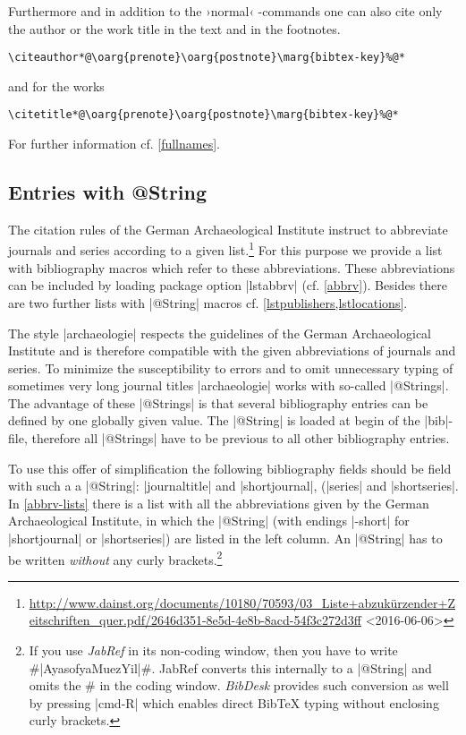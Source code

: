 \documentclass[a4paper,
10pt,
greek,
french,
spanish,
italian,
ngerman,
english
]{ltxdoc}
\begin{document}
\DescribeMacro{\citeauthor}\DescribeMacro{\citetitle}\label{citeauthor}%
Furthermore and in addition to the ›normal‹ -commands one can also cite only the author or the work title in the text and in the footnotes.
\begin{lstlisting}
\citeauthor*@\oarg{prenote}\oarg{postnote}\marg{bibtex-key}%@*
\end{lstlisting} 
  and for the works 
\begin{lstlisting}
\citetitle*@\oarg{prenote}\oarg{postnote}\marg{bibtex-key}%@*
\end{lstlisting} 
For further information cf. \cref{fullnames}.


\subsection{Entries with @String}\label{string}
The citation rules of the German Archaeological Institute instruct to abbreviate journals and series according to a given list.\footnote{\url{http://www.dainst.org/documents/10180/70593/03_Liste+abzukürzender+Zeitschriften_quer.pdf/2646d351-8e5d-4e8b-8acd-54f3c272d3ff} <2016-06-06>}
For this purpose we provide a list with bibliography macros which refer to these abbreviations. 
These abbreviations can be included by loading package option |lstabbrv| (cf. \cref{abbrv}). 
Besides there are two further lists with |@String| macros cf. \cref{lstpublishers,lstlocations}.

 The style |archaeologie| respects the guidelines of the German Archaeological Institute 
and is therefore compatible with the given abbreviations of journals and series.
To minimize the susceptibility to errors and to omit unnecessary typing of sometimes very long journal titles |archaeologie| works with so-called |@Strings|.
The advantage of these |@Strings| is that several bibliography entries can be defined by one globally given value. 
The |@String| is loaded at begin of the |bib|-file, therefore all |@Strings| have to be previous to all other bibliography entries.
 
To use this offer of simplification the following bibliography fields should be field with such a a |@String|: |journaltitle| and |shortjournal|,
(|series| and |shortseries|.
In \cref{abbrv-lists} there is a list with all the abbreviations given by the German Archaeological Institute, 
in which the |@String| (with endings |-short| for |shortjournal| or |shortseries|) are listed in the left column.  
An |@String| has to be written \emph{without} any curly brackets.\footnote{If you use \emph{JabRef} in its non-coding window, 
then you have to write \#|AyasofyaMuezYil|\#. JabRef converts this internally to a |@String| and omits the \# in the coding window. 
\emph{BibDesk} provides such conversion as well by pressing |cmd-R| which enables direct BibTeX typing without enclosing curly brackets.}
\end{document}
